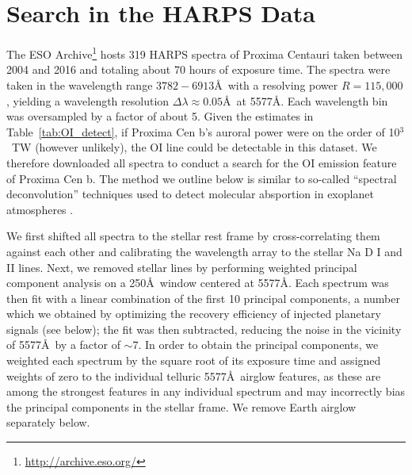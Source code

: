 \documentclass{emulateapj}
\begin{document}
\section{Search in the HARPS Data}
\label{sec:search}

The ESO Archive\footnote{\url{http://archive.eso.org/}} hosts 319 HARPS spectra of Proxima Centauri taken between 2004 and 2016 and totaling about 70 hours of exposure time. The spectra were taken in the wavelength range $3782-6913$\AA\ with a resolving power $R = 115,000$, yielding a wavelength resolution $\Delta\lambda \approx 0.05$\AA\ at 5577\AA. Each wavelength bin was oversampled by a factor of about 5. Given the estimates in Table~\ref{tab:OI_detect}, if Proxima Cen b's auroral power were on the order of 10$^{3}$~TW (however unlikely), the OI line could be detectable in this dataset. We therefore downloaded all spectra to conduct a search for the OI emission feature of Proxima Cen b. The method we outline below is similar to so-called ``spectral deconvolution'' techniques used to detect molecular absportion in exoplanet atmospheres \citep[e.g.,][]{SparksFord2002,RiaudSchneider2007,Kawahara2014,Snellen2015}.

We first shifted all spectra to the stellar rest frame by cross-correlating them against each other and calibrating the wavelength array to the stellar Na D I and II lines. Next, we removed stellar lines by performing weighted principal component analysis \citep[WPCA;][]{Delchambre2015} on a 250\AA\ window centered at 5577\AA. Each spectrum was then fit with a linear combination of the first 10 principal components, a number which we obtained by optimizing the recovery efficiency of injected planetary signals (see below); the fit was then subtracted, reducing the noise in the vicinity of 5577\AA\ by a factor of ${\sim} 7$. In order to obtain the principal components, we weighted each spectrum by the square root of its exposure time and assigned weights of zero to the individual telluric 5577\AA\ airglow features, as these are among the strongest features in any individual spectrum and may incorrectly bias the principal components in the stellar frame. We remove Earth airglow separately below.
\end{document}
